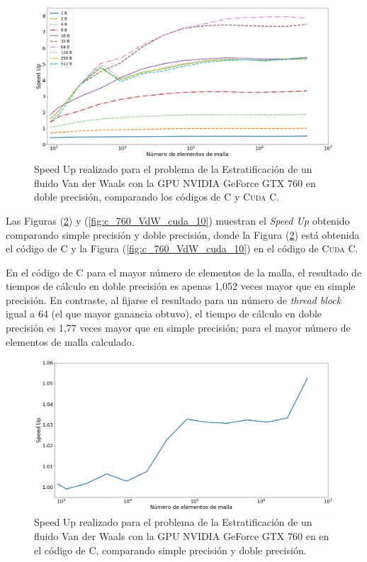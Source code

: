 \begin{figure}[htbp]
	\centering
	\includegraphics[width=\textwidth]{figs/cap4/s_760_VdW_double_10}
	\caption{Speed Up realizado para el problema de la Estratificación de un fluido Van der Waals con la GPU NVIDIA GeForce GTX 760 en doble precisión, comparando los códigos de \textsc{C} y \textsc{Cuda C}.} 
	\label{fig:s_760_VdW_double_10}	
\end{figure}

\newpage

Las Figuras (\ref{fig:c_760_VdW_c_10}) y (\ref{fig:c_760_VdW_cuda_10}) muestran el \textit{Speed Up} obtenido comparando simple precisión y doble precisión, donde la Figura (\ref{fig:c_760_VdW_c_10}) está obtenida el código de \textsc{C} y la Figura (\ref{fig:c_760_VdW_cuda_10}) en el código de \textsc{Cuda C}. 

En el código de \textsc{C} para el mayor número de elementos de la malla, el resultado de tiempos de cálculo en doble precisión es apenas 1,052 veces mayor que en  simple precisión. En contraste, al fijarse el resultado para un número de \textit{thread block} igual a 64 (el que mayor ganancia obtuvo), el tiempo de cálculo en doble precisión es 1,77 veces mayor que en simple precisión; para el mayor número de elementos de malla calculado.

\begin{figure}[htbp]
	\centering
	\includegraphics[width=\textwidth]{figs/cap4/c_760_VdW_c_10}
	\caption{Speed Up realizado para el problema de la Estratificación de un fluido Van der Waals con la GPU NVIDIA GeForce GTX 760 en en el código de \textsc{C}, comparando simple precisión y doble precisión.} 
	\label{fig:c_760_VdW_c_10}	
\end{figure}

